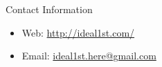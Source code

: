 \documentclass[final]{beamer}
\newlength{\sepwid}
\newlength{\onecolwid}
\begin{document}
\begin{frame}
\begin{columns}[t]
\begin{column}{\onecolwid}







\begin{block}{Contact Information}

\begin{itemize}
\item Web: \href{http://ideal1st.com/}{http://ideal1st.com/}
\item Email: \href{mailto:ideal1st.here@gmail.com}{ideal1st.here@gmail.com}
\end{itemize}

\end{block}


\end{column} %

\begin{column}{\sepwid}\end{column} %

\end{columns} %

\end{frame} %
\end{document}
